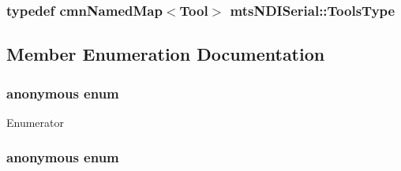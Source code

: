 \subsubsection[{Tools\+Type}]{\setlength{\rightskip}{0pt plus 5cm}typedef {\bf cmn\+Named\+Map}$<${\bf Tool}$>$ {\bf mts\+N\+D\+I\+Serial\+::\+Tools\+Type}\hspace{0.3cm}{\ttfamily [protected]}}\label{classmts_n_d_i_serial_aa7927ca6826aae84f89df0ca800fe6bd}


\subsection{Member Enumeration Documentation}
\hypertarget{classmts_n_d_i_serial_a10d136b08ef709839e26c8ba9c0b2a1a}{}\subsubsection[{anonymous enum}]{\setlength{\rightskip}{0pt plus 5cm}anonymous enum\hspace{0.3cm}{\ttfamily [protected]}}\label{classmts_n_d_i_serial_a10d136b08ef709839e26c8ba9c0b2a1a}
\begin{Desc}
\item[Enumerator]\par
\begin{description}
\item[{\em 
\hypertarget{classmts_n_d_i_serial_a10d136b08ef709839e26c8ba9c0b2a1aa5a2ba9c836a108b8648fa0887336f5cd}{}M\+A\+X\+\_\+\+B\+U\+F\+F\+E\+R\+\_\+\+S\+I\+Z\+E\label{classmts_n_d_i_serial_a10d136b08ef709839e26c8ba9c0b2a1aa5a2ba9c836a108b8648fa0887336f5cd}
}]\end{description}
\end{Desc}
\hypertarget{classmts_n_d_i_serial_ac9a66e1b84813b6faf88aff391286ecb}{}\subsubsection[{anonymous enum}]{\setlength{\rightskip}{0pt plus 5cm}anonymous enum\hspace{0.3cm}{\ttfamily [protected]}}\label{classmts_n_d_i_serial_ac9a66e1b84813b6faf88aff391286ecb}

